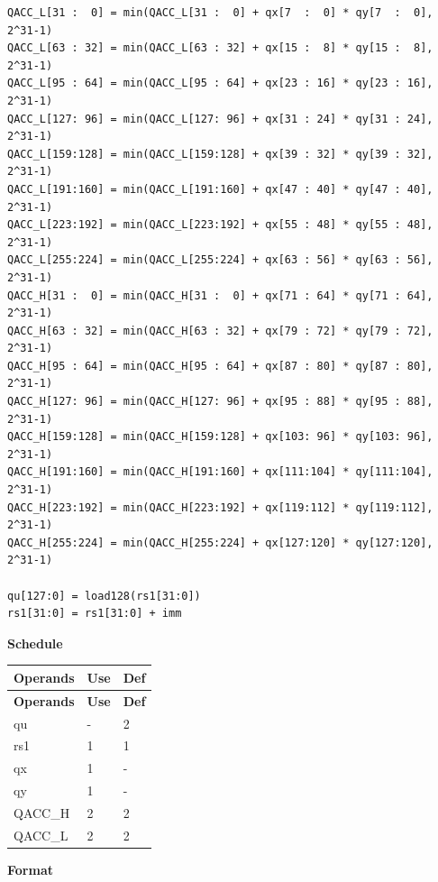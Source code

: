 \begin{lstlisting}
QACC_L[31 :  0] = min(QACC_L[31 :  0] + qx[7  :  0] * qy[7  :  0], 2^31-1)
QACC_L[63 : 32] = min(QACC_L[63 : 32] + qx[15 :  8] * qy[15 :  8], 2^31-1)
QACC_L[95 : 64] = min(QACC_L[95 : 64] + qx[23 : 16] * qy[23 : 16], 2^31-1)
QACC_L[127: 96] = min(QACC_L[127: 96] + qx[31 : 24] * qy[31 : 24], 2^31-1)
QACC_L[159:128] = min(QACC_L[159:128] + qx[39 : 32] * qy[39 : 32], 2^31-1)
QACC_L[191:160] = min(QACC_L[191:160] + qx[47 : 40] * qy[47 : 40], 2^31-1)
QACC_L[223:192] = min(QACC_L[223:192] + qx[55 : 48] * qy[55 : 48], 2^31-1)
QACC_L[255:224] = min(QACC_L[255:224] + qx[63 : 56] * qy[63 : 56], 2^31-1)
QACC_H[31 :  0] = min(QACC_H[31 :  0] + qx[71 : 64] * qy[71 : 64], 2^31-1)
QACC_H[63 : 32] = min(QACC_H[63 : 32] + qx[79 : 72] * qy[79 : 72], 2^31-1)
QACC_H[95 : 64] = min(QACC_H[95 : 64] + qx[87 : 80] * qy[87 : 80], 2^31-1)
QACC_H[127: 96] = min(QACC_H[127: 96] + qx[95 : 88] * qy[95 : 88], 2^31-1)
QACC_H[159:128] = min(QACC_H[159:128] + qx[103: 96] * qy[103: 96], 2^31-1)
QACC_H[191:160] = min(QACC_H[191:160] + qx[111:104] * qy[111:104], 2^31-1)
QACC_H[223:192] = min(QACC_H[223:192] + qx[119:112] * qy[119:112], 2^31-1)
QACC_H[255:224] = min(QACC_H[255:224] + qx[127:120] * qy[127:120], 2^31-1)

qu[127:0] = load128(rs1[31:0])
rs1[31:0] = rs1[31:0] + imm
\end{lstlisting}

\textbf{Schedule}\\
\begin{longtable}[c]{|l|l|l|}
    \hline
    \rowcolor{lightgray}
    \textbf{Operands} & \textbf{Use} & \textbf{Def} \\\hline
    \endfirsthead
    \hline
    \rowcolor{lightgray}
     \textbf{Operands} & \textbf{Use} & \textbf{Def} \\\hline
    \endhead
    \hline
    \endfoot

    qu & - & 2 \\\hline
    rs1 & 1 & 1 \\\hline
     qx & 1 & - \\\hline
     qy & 1 & - \\\hline
     QACC\_H & 2 & 2 \\\hline
     QACC\_L & 2 & 2

\end{longtable}

\textbf{Format}\\

